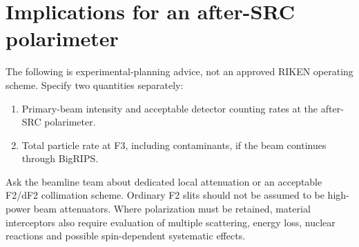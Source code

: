 \documentclass[11pt,a4paper]{article}
\begin{document}
\section{Implications for an after-SRC polarimeter}
The following is experimental-planning advice, not an approved RIKEN operating scheme. Specify two quantities separately:
\begin{enumerate}
\item Primary-beam intensity and acceptable detector counting rates at the after-SRC polarimeter.
\item Total particle rate at F3, including contaminants, if the beam continues through BigRIPS.
\end{enumerate}
Ask the beamline team about dedicated local attenuation or an acceptable F2/dF2 collimation scheme. Ordinary F2 slits should not be assumed to be high-power beam attenuators. Where polarization must be retained, material interceptors also require evaluation of multiple scattering, energy loss, nuclear reactions and possible spin-dependent systematic effects.
\end{document}
